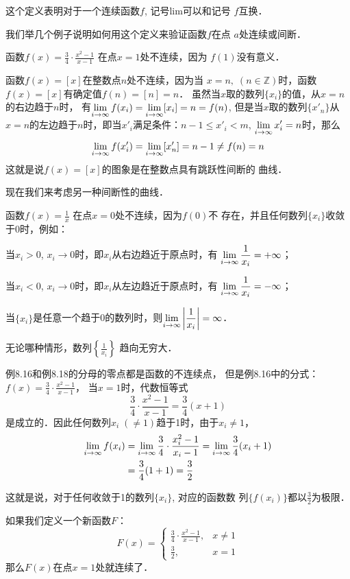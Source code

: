 这个定义表明对于一个连续函数$f$, 记号lim可以和记号
$f$互换．

我们举几个例子说明如何用这个定义来验证函数$f$在点
$a$处连续或间断．


\begin{example}
    函数$f(x)=\frac{3}{4}\cdot\frac{x^2-1}{x-1}$
在点$x=1$处不连续，因为
$f(1)$没有意义．
\end{example}

\begin{example}
    函数$f(x)=[x]$在整数点$n$处不连续，因为当
$x=n,\; (n\in\mathbb{Z})$时，函数$f(x)=[x]$有确定值$f(n)=[n]=n$．
虽然当$x$取的数列$\{x_i\}$的值，从$x=n$的右边趋于$n$时，
有$\displaystyle\lim_{i\to\infty}f(x_i)=\displaystyle\lim_{i\to\infty}[x_i]=n=f(n)$, 但是当$x$取的数列$\{x'_n\}$从$x=n$的左边趋于$n$时，即当$x'_i$满足条件：$n-1\le x'_i <m$, $\displaystyle\lim_{i\to \infty}x'_i=n$时，那么
\[\displaystyle\lim_{i\to \infty}f(x'_i)=\displaystyle\lim_{i\to \infty}[x'_n]=n-1\ne f(n)=n\]
这就是说$f(x)=[x]$的图象是在整数点具有跳跃性间断的
曲线．
\end{example}

现在我们来考虑另一种间断性的曲线．
\begin{example}
    函数$f(x)=\frac{1}{x}$
    在点$x=0$处不连续，因为$f(0)$不
    存在，并且任何数列$\{x_i\}$收敛于0时，例如：
    
    当$x_i>0$, $x_i\to 0$时，即$x_i$从右边趋近于原点时，有
$\displaystyle\lim_{i\to\infty}\dfrac{1}{x_i}=+\infty$；

    当$x_i<0$, $x_i\to 0$时，即$x_i$从左边趋近于原点时，有
    $\displaystyle\lim_{i\to\infty}\dfrac{1}{x_i}=-\infty$；

    当$\{x_i\}$是任意一个趋于0的数列时，则$\displaystyle\lim_{i\to\infty}\left|\dfrac{1}{x_i}\right|=\infty$．

    无论哪种情形，数列$\left\{\frac{1}{x_i}\right\}$
    趋向无穷大．
\end{example}

\begin{rmk}
例8.16和例8.18的分母的零点都是函数的不连续点，
但是例8.16中的分式：$f(x)=\frac{3}{4}\cdot\frac{x^2-1}{x-1}$，
当$x=1$时，代数恒等式
\[\frac{3}{4}\cdot\frac{x^2-1}{x-1}=\frac{3}{4}(x+1)\]
是成立的．因此任何数列$x_i\; (\ne 1)$趋于1时，由于$x_i\ne 1$，
\[\begin{split}
    \displaystyle\lim_{i\to\infty}f(x_i)&=\displaystyle\lim_{i\to\infty}\dfrac{3}{4}\cdot \dfrac{x^2_i-1}{x_i-1}=\displaystyle\lim_{i\to\infty}\dfrac{3}{4}(x_i+1)\\
    &=\dfrac{3}{4}(1+1)=\dfrac{3}{2}
\end{split}\]

这就是说，对于任何收敛于1的数列$\{x_i\}$, 对应的函数数
列$\{f(x_i)\}$都以$\frac{3}{2}$为极限． 

如果我们定义一个新函数$F$：
\[F(x)=\begin{cases}
    \frac{3}{4}\cdot\frac{x^2-1}{x-1},& x\ne 1\\
    \frac{3}{2}, & x=1
\end{cases}\]
那么$F(x)$在点$x=1$处就连续了．
\end{rmk}

